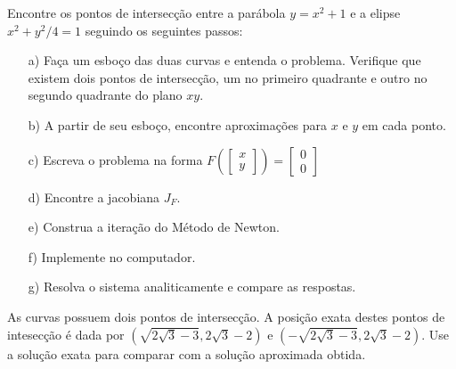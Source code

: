 \begin{exer}\label{prob_para_elipse}
 Encontre os pontos de intersecção entre a parábola $y=x^2+1$ e a elipse $x^2+y^2/4=1$ seguindo os seguintes passos:
\begin{itemize}
\item[a)] Faça um esboço das duas curvas e entenda o problema. Verifique que existem dois pontos de intersecção, um no primeiro quadrante e outro no segundo quadrante do plano $xy$.
\item[b)] A partir de seu esboço, encontre aproximações para $x$ e $y$ em cada ponto.
\item[c)] Escreva o problema na forma $F\left(\left[\begin{array}{c}x\\y\end{array}\right]\right)=\left[\begin{array}{c}0\\0\end{array}\right]$
\item[d)] Encontre a jacobiana $J_F$.
\item[e)] Construa a iteração do Método de Newton.
\item[f)] Implemente no computador.
\item[g)] Resolva o sistema analiticamente e compare as respostas.
\end{itemize}
\end{exer}
\begin{resp}
As curvas possuem dois pontos de intersecção. A posição exata destes pontos de intesecção é dada por $\left(\sqrt{2\sqrt{3}-3},2\sqrt{3}-2\right)$ e $\left(-\sqrt{2\sqrt{3}-3},2\sqrt{3}-2\right)$. Use a solução exata para comparar com a solução aproximada obtida.
\end{resp}

